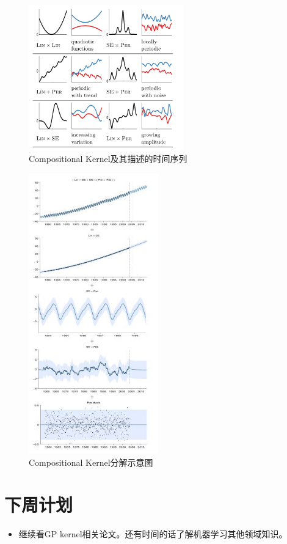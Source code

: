 \documentclass{ctexart}
\begin{document}
\begin{enumerate}
\begin{figure}
  \centering
  \includegraphics[width=0.6\textwidth]{com.png}
  \caption{Compositional Kernel及其描述的时间序列}\label{3}
\end{figure}

\begin{figure}
  \centering
  \includegraphics[width=0.5\textwidth]{kernel.jpg}
  \caption{Compositional Kernel分解示意图}\label{1}
\end{figure}

\end{enumerate}

\section*{下周计划}
\begin{itemize}
  \item 继续看GP kernel相关论文。还有时间的话了解机器学习其他领域知识。
\end{itemize}
\end{document}
